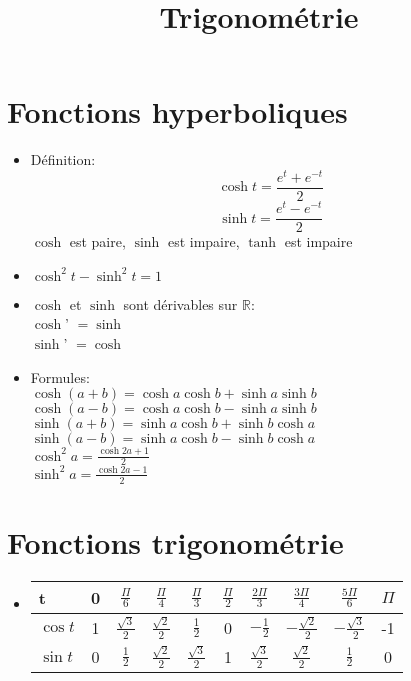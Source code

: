 \documentclass{article}
\title{Trigonom\'{e}trie}
\date{}
\begin{document}
\maketitle

\section{Fonctions hyperboliques}
\begin{itemize}
	\item D\'{e}finition:
	$$ \cosh t = \frac{e^t + e^{-t}}{2} $$
	$$ \sinh t = \frac{e^t - e^{-t}}{2} $$
	$\cosh$ est paire, $\sinh$ est impaire, $\tanh$ est impaire
	\item $ \cosh^2 t - \sinh^2 t = 1 $
	\item $\cosh$ et $\sinh$ sont d\'{e}rivables sur $\mathbb{R}$: \\
	$\cosh$' $ = \sinh$ \\
	$\sinh$' $ = \cosh$
	\newline
	\item Formules: \\
	$\cosh (a+b) = \cosh a\cosh b + \sinh a\sinh b$ \\
	$\cosh (a-b) = \cosh a\cosh b - \sinh a\sinh b$ \\
	$\sinh (a+b) = \sinh a\cosh b + \sinh b\cosh a$ \\
	$\sinh (a-b) = \sinh a\cosh b - \sinh b\cosh a$ \\
	$\cosh^2 a = \frac{\cosh 2a + 1}{2}$ \\
	$\sinh^2 a = \frac{\cosh 2a - 1}{2}$
\end{itemize}

\section{Fonctions trigonom\'{e}trie}
\begin{itemize}
	\item \begin{tabular}{l|c|c|c|c|c|c|c|c|c}
	t & 0 & $\frac{\Pi}{6}$ & $\frac{\Pi}{4}$ & $\frac{\Pi}{3}$ & $\frac{\Pi}{2}$ & $\frac{2\Pi}{3}$ & $\frac{3\Pi}{4}$ & $\frac{5\Pi}{6}$ & $\Pi$ \\
	\hline
	$\cos t$ & 1 & $\frac{\sqrt{3}}{2}$ & $\frac{\sqrt{2}}{2}$ & $\frac{1}{2}$ & 0 & $-\frac{1}{2}$ & $-\frac{\sqrt{2}}{2}$ & $-\frac{\sqrt{3}}{2}$ & -1 \\
	$\sin t$ & 0 & $\frac{1}{2}$ & $\frac{\sqrt{2}}{2}$ & $\frac{\sqrt{3}}{2}$ & 1 & $\frac{\sqrt{3}}{2}$ & $\frac{\sqrt{2}}{2}$ & $\frac{1}{2}$ & 0 \\

	\end{tabular}

\end{itemize}
\end{document}

